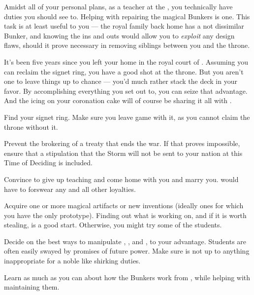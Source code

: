 \documentclass[char]{GL2020}
\begin{document}
Amidst all of your personal plans, as a teacher at the \pSc{}, you technically have duties you should see to. Helping \cBunker{\full} with repairing the magical Bunkers is one. This task is at least useful to you — the royal family back home has a not dissimilar Bunker, and knowing the ins and outs would allow you to \emph{exploit} any design flaws, should it prove necessary in removing siblings between you and the throne.

It's been five years since you left your home in the royal court of \pFarm{}. Assuming you can reclaim the signet ring, you have a good shot at the throne. But you aren't one to leave things up to chance — you'd much rather stack the deck in your favor. By accomplishing everything you set out to, you can seize that advantage. And the icing on your coronation cake will of course be sharing it all with \cPirate{}.

\begin{itemz}
    \item Find your signet ring. Make sure you leave game with it, as you cannot claim the \pFarm{} throne without it.
    \item Prevent the brokering of a treaty that ends the war. If that proves impossible, ensure that a stipulation that the Storm will not be sent to your nation at this Time of Deciding is included.
    \item Convince \cPirate{} to give up teaching and come home with you and marry you. \cPirate{\They} would have to forswear any and all other loyalties.
    \item Acquire one or more magical artifacts or new inventions (ideally ones for which you have the only prototype). Finding out what \cCurse{} is working on, and if it is worth stealing, is a good start. Otherwise, you might try some of the \pTech{} students.
    \item Decide on the best ways to manipulate \cAdopted{}, \cAmbition{}, and \cChupstudent{}, to your advantage. Students are often easily swayed by promises of future power. Make sure \cAdopted{} is not up to anything inappropriate for a noble like shirking \cAdopted{\their} duties.
    \item Learn as much as you can about how the Bunkers work from \cBunker{}, while helping with maintaining them.
\end{itemz}
\end{document}
